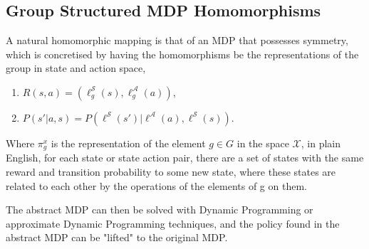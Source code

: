 \subsection{Group Structured MDP Homomorphisms}
A natural homomorphic mapping is that of an MDP that possesses symmetry, which is concretised by having the homomorphisms be the representations of the group in state and action space,
\begin{enumerate}
	\item $R(s, a) = (\ell^\mathcal{S}_g(s), \ell^\mathcal{A}_g(a))$,
	\item $P(s'| a, s) =P(\ell^\mathcal{S}(s')| \ell^\mathcal{A}(a), \ell^\mathcal{S}(s))$.
\end{enumerate}
Where $\pi_g^x$ is the representation of the element $g \in G$ in the space $\mathcal{X}$, in plain English, for each state or state action pair, there are a set of states with the same reward and transition probability to some new state, where these states are related to each other by the operations of the elements of g on them.



The abstract MDP can then be solved with Dynamic Programming or approximate Dynamic Programming techniques, and the policy found in the abstract MDP can be "lifted" to the original MDP.



